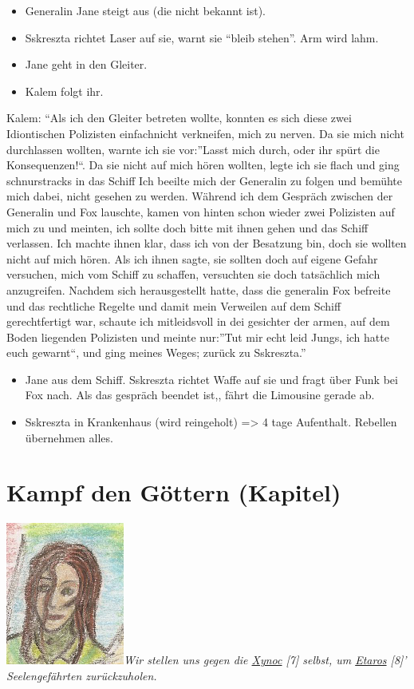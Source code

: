\documentclass[11pt]{article}
\begin{document}
\begin{itemize}
  \begin{itemize}
  \item
    Generalin Jane steigt aus (die nicht bekannt ist).
  \item
    Sskreszta richtet Laser auf sie, warnt sie ``bleib stehen''. Arm
    wird lahm.
  \item
    Jane geht in den Gleiter.
  \item
    Kalem folgt ihr.
  \end{itemize}
\end{itemize}
Kalem: ``Als ich den Gleiter betreten wollte, konnten es sich diese zwei
Idiontischen Polizisten einfachnicht verkneifen, mich zu nerven. Da sie
mich nicht durchlassen wollten, warnte ich sie vor:''Lasst mich durch,
oder ihr spürt die Konsequenzen!``. Da sie nicht auf mich hören wollten,
legte ich sie flach und ging schnurstracks in das Schiff Ich beeilte
mich der Generalin zu folgen und bemühte mich dabei, nicht gesehen zu
werden. Während ich dem Gespräch zwischen der Generalin und Fox
lauschte, kamen von hinten schon wieder zwei Polizisten auf mich zu und
meinten, ich sollte doch bitte mit ihnen gehen und das Schiff verlassen.
Ich machte ihnen klar, dass ich von der Besatzung bin, doch sie wollten
nicht auf mich hören. Als ich ihnen sagte, sie sollten doch auf eigene
Gefahr versuchen, mich vom Schiff zu schaffen, versuchten sie doch
tatsächlich mich anzugreifen. Nachdem sich herausgestellt hatte, dass
die generalin Fox befreite und das rechtliche Regelte und damit mein
Verweilen auf dem Schiff gerechtfertigt war, schaute ich mitleidsvoll in
dei gesichter der armen, auf dem Boden liegenden Polizisten und meinte
nur:''Tut mir echt leid Jungs, ich hatte euch gewarnt``, und ging meines
Weges; zurück zu Sskreszta.''

\begin{itemize}
\item
  Jane aus dem Schiff. Sskreszta richtet Waffe auf sie und fragt über
  Funk bei Fox nach. Als das gespräch beendet ist,, fährt die Limousine
  gerade ab.
\item
  Sskreszta in Krankenhaus (wird reingeholt) =\textgreater{} 4 tage
  Aufenthalt. Rebellen übernehmen alles.
\end{itemize}
\section{Kampf den Göttern (Kapitel)}

\includegraphics{sskreszta-portrait-alt-klein.png}\emph{Wir
stellen uns gegen die
\href{http://1w6.org/deutsch/welten/raumzeit/spezies\#xynoc}{Xynoc}
{[}7{]} selbst, um
\href{http://1w6.org/deutsch/kampagnen/w-chter-der-zeit/nscs\#etaros}{Etaros}
{[}8{]}' Seelengefährten zurückzuholen.}
\end{document}
